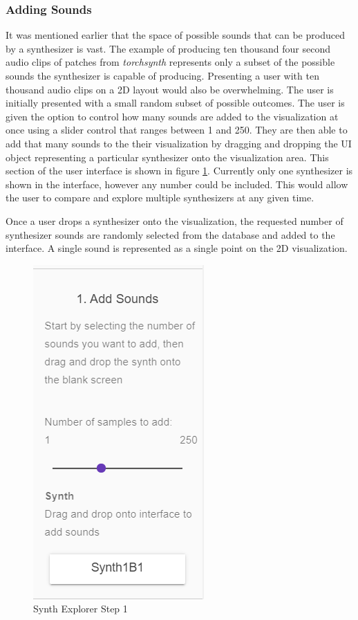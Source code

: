 \subsubsection{Adding Sounds}
It was mentioned earlier that the space of possible sounds that can be produced by a synthesizer is vast. The example of producing ten thousand four second audio clips of patches from \textit{torchsynth} represents only a subset of the possible sounds the synthesizer is capable of producing. Presenting a user with ten thousand audio clips on a 2D layout would also be overwhelming. The user is initially presented with a small random subset of possible outcomes. The user is given the option to control how many sounds are added to the visualization at once using a slider control that ranges between 1 and 250. They are then able to add that many sounds to the their visualization by dragging and dropping the UI object representing a particular synthesizer onto the visualization area. This section of the user interface is shown in figure \ref{fig:steup 1}. Currently only one synthesizer is shown in the interface, however any number could be included. This would allow the user to compare and explore multiple synthesizers at any given time. 

Once a user drops a synthesizer onto the visualization, the requested number of synthesizer sounds are randomly selected from the database and added to the interface. A single sound is represented as a single point on the 2D visualization.

\begin{figure}
    \centering
    \includegraphics[width=0.3\linewidth]{SynthExplore_AddSounds.png}
    \caption{Synth Explorer Step 1}
    \label{fig:steup 1}
\end{figure}

